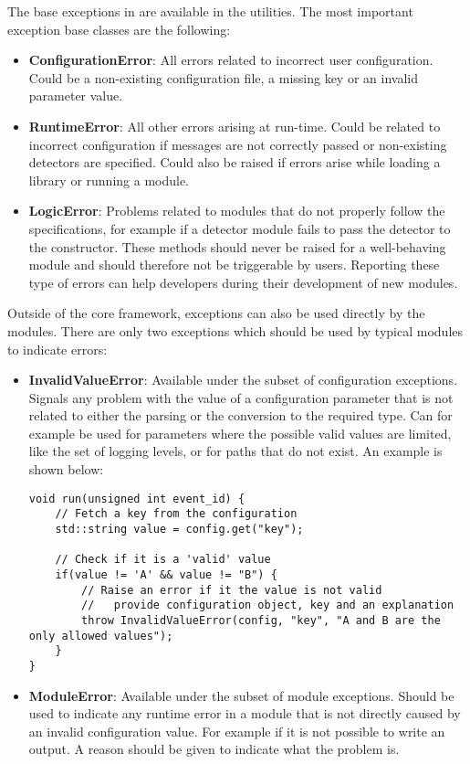 The base exceptions in \apsq are available in the utilities. The most important exception base classes are the following:
\begin{itemize}
\item \textbf{ConfigurationError}: All errors related to incorrect user configuration. Could be a non-existing configuration file, a missing key or an invalid parameter value.
\item \textbf{RuntimeError}: All other errors arising at run-time. Could be related to incorrect configuration if messages are not correctly passed or non-existing detectors are specified. Could also be raised if errors arise while loading a library or running a module.
\item \textbf{LogicError}: Problems related to modules that do not properly follow the specifications, for example if a detector module fails to pass the detector to the constructor. These methods should never be raised for a well-behaving module and should therefore not be triggerable by users. Reporting these type of errors can help developers during their development of new modules.
\end{itemize}

Outside of the core framework, exceptions can also be used directly by the modules. There are only two exceptions which should be used by typical modules to indicate errors:
\begin{itemize}
\item \textbf{InvalidValueError}: Available under the subset of configuration exceptions. Signals any problem with the value of a configuration parameter that is not related to either the parsing or the conversion to the required type. Can for example be used for parameters where the possible valid values are limited, like the set of logging levels, or for paths that do not exist. An example is shown below:
\begin{verbatim}
void run(unsigned int event_id) {
    // Fetch a key from the configuration
    std::string value = config.get("key");
    
    // Check if it is a 'valid' value
    if(value != 'A' && value != "B") {
        // Raise an error if it the value is not valid
        //   provide configuration object, key and an explanation
        throw InvalidValueError(config, "key", "A and B are the only allowed values");
    }
}
\end{verbatim}
\item \textbf{ModuleError}: Available under the subset of module exceptions. Should be used to indicate any runtime error in a module that is not directly caused by an invalid configuration value. For example if it is not possible to write an output. A reason should be given to indicate what the problem is. 
\end{itemize}

